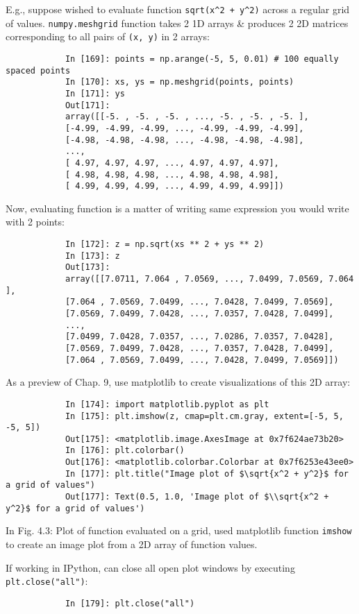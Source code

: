 \documentclass{article}
\begin{document}
\begin{itemize}
\begin{itemize}
		E.g., suppose wished to evaluate function \verb|sqrt(x^2 + y^2)| across a regular grid of values. {\tt numpy.meshgrid} function takes 2 1D arrays \& produces 2 2D matrices corresponding to all pairs of {\tt(x, y)} in 2 arrays:
		\begin{verbatim}
			In [169]: points = np.arange(-5, 5, 0.01) # 100 equally spaced points
			In [170]: xs, ys = np.meshgrid(points, points)
			In [171]: ys
			Out[171]:
			array([[-5. , -5. , -5. , ..., -5. , -5. , -5. ],
			[-4.99, -4.99, -4.99, ..., -4.99, -4.99, -4.99],
			[-4.98, -4.98, -4.98, ..., -4.98, -4.98, -4.98],
			...,
			[ 4.97, 4.97, 4.97, ..., 4.97, 4.97, 4.97],
			[ 4.98, 4.98, 4.98, ..., 4.98, 4.98, 4.98],
			[ 4.99, 4.99, 4.99, ..., 4.99, 4.99, 4.99]])
		\end{verbatim}
		Now, evaluating function is a matter of writing same expression you would write with 2 points:
		\begin{verbatim}
			In [172]: z = np.sqrt(xs ** 2 + ys ** 2)
			In [173]: z
			Out[173]:
			array([[7.0711, 7.064 , 7.0569, ..., 7.0499, 7.0569, 7.064 ],
			[7.064 , 7.0569, 7.0499, ..., 7.0428, 7.0499, 7.0569],
			[7.0569, 7.0499, 7.0428, ..., 7.0357, 7.0428, 7.0499],
			...,
			[7.0499, 7.0428, 7.0357, ..., 7.0286, 7.0357, 7.0428],
			[7.0569, 7.0499, 7.0428, ..., 7.0357, 7.0428, 7.0499],
			[7.064 , 7.0569, 7.0499, ..., 7.0428, 7.0499, 7.0569]])
		\end{verbatim}
		As a preview of Chap. 9, use matplotlib to create visualizations of this 2D array:
		\begin{verbatim}
			In [174]: import matplotlib.pyplot as plt
			In [175]: plt.imshow(z, cmap=plt.cm.gray, extent=[-5, 5, -5, 5])
			Out[175]: <matplotlib.image.AxesImage at 0x7f624ae73b20>
			In [176]: plt.colorbar()
			Out[176]: <matplotlib.colorbar.Colorbar at 0x7f6253e43ee0>
			In [177]: plt.title("Image plot of $\sqrt{x^2 + y^2}$ for a grid of values")
			Out[177]: Text(0.5, 1.0, 'Image plot of $\\sqrt{x^2 + y^2}$ for a grid of values')
		\end{verbatim}
		In {\sf Fig. 4.3: Plot of function evaluated on a grid}, used matplotlib function {\tt imshow} to create an image plot from a 2D array of function values.
		
		If working in IPython, can close all open plot windows by executing {\tt plt.close("all")}:
		\begin{verbatim}
			In [179]: plt.close("all")
		\end{verbatim}
		

\end{itemize}
\end{itemize}
\end{document}
